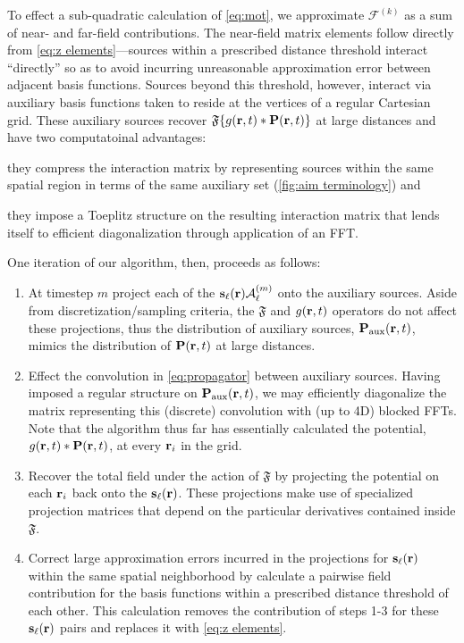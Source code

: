 To effect a sub-quadratic calculation of \cref{eq:mot}, we approximate $\mathcal{F}^{(k)}$ as a sum of near- and far-field contributions.
The near-field matrix elements follow directly from \cref{eq:z elements}---sources within a prescribed distance threshold interact ``directly'' so as to avoid incurring unreasonable approximation error between adjacent basis functions.
Sources beyond this threshold, however, interact via auxiliary basis functions taken to reside at the vertices of a regular Cartesian grid.
These auxiliary sources recover $\mathfrak{F}\qty{g(\vb{r}, t) \ast \vb{P}(\vb{r}, t)}$ at large distances and have two computatoinal advantages:
\begin{inparaenum}[(i)]
  \item they compress the interaction matrix by representing sources within the same spatial region in terms of the same auxiliary set (\cref{fig:aim terminology}) and
  \item they impose a Toeplitz structure on the resulting interaction matrix that lends itself to efficient diagonalization through application of an FFT.
\end{inparaenum}
One iteration of our algorithm, then, proceeds as follows:
\begin{enumerate}
  \item At timestep $m$ project each of the $\vb{s}_\ell(\vb{r}) \mathcal{A}^\qty(m)_\ell$ onto the auxiliary sources.
    Aside from discretization/sampling criteria, the $\mathfrak{F}$ and $g(\vb{r}, t)$ operators do not affect these projections, thus the distribution of auxiliary sources, $\vb{P}_\text{aux}(\vb{r}, t)$, mimics the distribution of $\vb{P}(\vb{r}, t)$ at large distances.
  \item Effect the convolution in \cref{eq:propagator} between auxiliary sources.
    Having imposed a regular structure on $\vb{P}_\text{aux}(\vb{r}, t)$, we may efficiently diagonalize the matrix representing this (discrete) convolution with (up to 4D) blocked FFTs.
    Note that the algorithm thus far has essentially calculated the potential, $g(\vb{r}, t) \ast \vb{P}(\vb{r}, t)$, at every $\vb{r}_i$ in the grid.
  \item Recover the total field under the action of $\mathfrak{F}$ by projecting the potential on each $\vb{r}_i$ back onto the $\vb{s}_\ell(\vb{r})$.
    These projections make use of specialized projection matrices that depend on the particular derivatives contained inside $\mathfrak{F}$.
  \item Correct large approximation errors incurred in the projections for $\vb{s}_\ell(\vb{r})$ within the same spatial neighborhood by calculate a pairwise field contribution for the basis functions within a prescribed distance threshold of each other.
    This calculation removes the contribution of steps 1-3 for these $\vb{s}_\ell(\vb{r})$ pairs and replaces it with \cref{eq:z elements}.
\end{enumerate}
